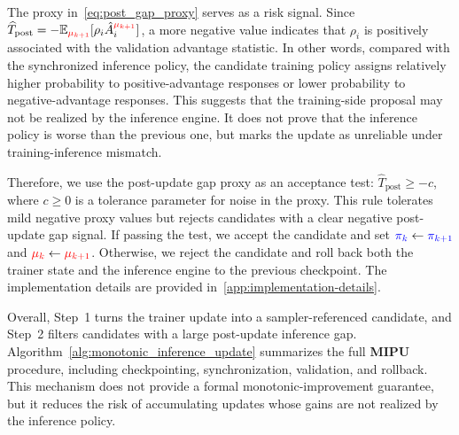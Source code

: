 The proxy in~\autoref{eq:post_gap_proxy} serves as a risk signal. 
Since \(\widehat T_{\mathrm{post}}=-\mathbb{E}_{\textcolor{red}{\mu_{k+1}}}[\rho_i\hat{A}^{\textcolor{red}{\mu_{k+1}}}_i]\), a more negative value indicates that \(\rho_i\) is positively associated with the validation advantage statistic. 
In other words, compared with the synchronized inference policy, the candidate training policy assigns relatively higher probability to positive-advantage responses or lower probability to negative-advantage responses.
This suggests that the training-side proposal may not be realized by the inference engine.
It does not prove that the inference policy is worse than the previous one, but marks the update as unreliable under training-inference mismatch.

Therefore, we use the post-update gap proxy as an acceptance test: $\widehat{T}_{\mathrm{post}} \geq -c$,
where $c\geq 0$ is a tolerance parameter for noise in the proxy. 
This rule tolerates mild negative proxy values but rejects candidates with a clear negative post-update gap signal. 
If passing the test, we accept the candidate and set 
$\textcolor{blue}{\pi_k}\leftarrow\textcolor{blue}{\pi_{k+1}}$ and 
$\textcolor{red}{\mu_k}\leftarrow\textcolor{red}{\mu_{k+1}}$. 
Otherwise, we reject the candidate and roll back both the trainer state and the inference engine to the previous checkpoint. The implementation details are provided in~\autoref{app:implementation-details}.

Overall, Step~1 turns the trainer update into a sampler-referenced candidate, and Step~2 filters candidates with a large post-update inference gap.
Algorithm~\autoref{alg:monotonic_inference_update} summarizes the full \textbf{MIPU} procedure, including checkpointing, synchronization, validation, and rollback.
This mechanism does not provide a formal monotonic-improvement guarantee, but it reduces the risk of accumulating updates whose gains are not realized by the inference policy.



\renewcommand{\algorithmiccomment}[1]{$\triangleright$ #1}

